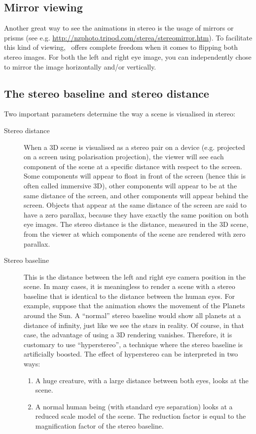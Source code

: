 \subsection{Mirror viewing}
Another great way to see the animations in stereo is the usage of mirrors or prisms (see e.g. 
\url{http://nzphoto.tripod.com/sterea/stereomirror.htm}). To facilitate this kind of viewing, \softwarename\ offers complete freedom when it comes to flipping both stereo images. For both the left and right eye image, you can independently chose to mirror the image horizontally and/or vertically.

\subsection{The stereo baseline and stereo distance \label{stereobaseline}}
Two important parameters determine the way a scene is visualised in stereo:
\begin{description}
\item[Stereo distance] When a 3D scene is visualised as a stereo pair on a device (e.g. projected on a screen using polarisation projection), the viewer will see each component of the scene at a specific distance with respect to the screen. Some components will appear to float in front of the screen (hence this is often called immersive 3D), other components will appear to be at the same distance of the screen, and other components will appear behind the screen. Objects that appear at the same distance of the screen are said to have a zero parallax, because they have exactly the same position on both eye images. The stereo distance is the distance, measured in the 3D scene, from the viewer at which components of the scene are rendered with zero parallax.
\item[Stereo baseline] This is the distance between the left and right eye camera position in the scene. In many cases, it is meaningless to render a scene with a stereo baseline that is identical to the distance between the human eyes. For example, suppose that the animation shows the movement of the Planets around the Sun. A ``normal'' stereo baseline would show all planets at a distance of infinity, just like we see the stars in reality. Of course, in that case, the advantage of using a 3D rendering vanishes. Therefore, it is customary to use ``hyperstereo'', a technique where the stereo baseline is artificially boosted. The effect of hyperstereo can be interpreted in two ways:
\begin{enumerate}
\item A huge creature, with a large distance between both eyes, looks at the scene.
\item A normal human being (with standard eye separation) looks at a reduced scale model of the scene. The reduction factor is equal to the magnification factor of the stereo baseline.
\end{enumerate}
\end{description}
